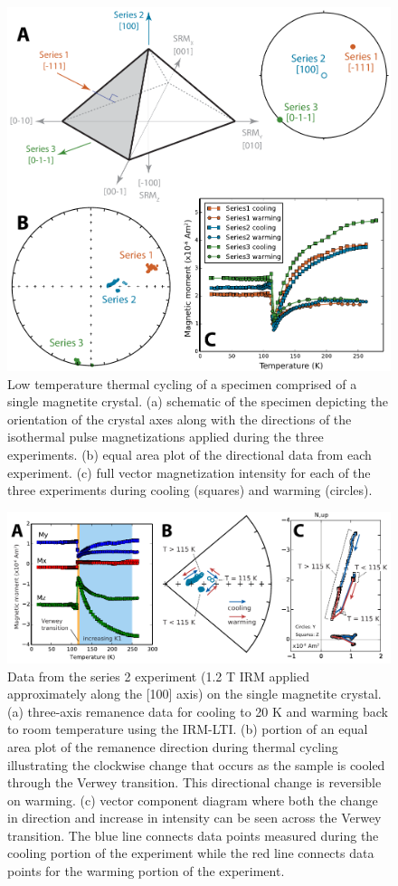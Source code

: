 \documentclass[draft,gc]{AGUTeX}
\begin{document}
\begin{figure}
\noindent\includegraphics[width=\textwidth]{Magnetite1.pdf}
\caption{Low temperature thermal cycling of a specimen comprised of a single magnetite crystal. (a) schematic of the specimen depicting the orientation of the crystal axes along with the directions of the isothermal pulse magnetizations applied during the three experiments. (b) equal area plot of the directional data from each experiment. (c) full vector magnetization intensity for each of the three experiments during cooling (squares) and warming (circles).}
\label{fig:magnetite1}
\end{figure}

\begin{figure}
\noindent\includegraphics[width=\textwidth]{Magnetite2.pdf}
\caption{Data from the series 2 experiment (1.2 T IRM applied approximately along the [100] axis) on the single magnetite crystal. (a) three-axis remanence data for cooling to 20 K and warming back to room temperature using the IRM-LTI. (b) portion of an equal area plot of the remanence direction during thermal cycling illustrating the clockwise change that occurs as the sample is cooled through the Verwey transition. This directional change is reversible on warming. (c) vector component diagram where both the change in direction and increase in intensity can be seen across the Verwey transition. The blue line connects data points measured during the cooling portion of the experiment while the red line connects data points for the warming portion of the experiment.
}
\label{fig:magnetite2}
\end{figure}
\end{document}
